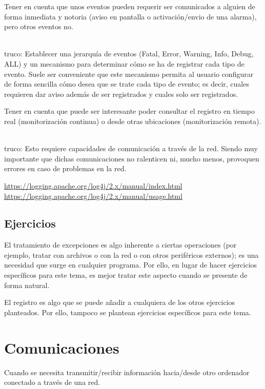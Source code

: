 \documentclass[spanish,12pt,a4paper,final,oneside]{book}
\begin{document}
Tener en cuenta que unos eventos pueden requerir ser comunicados a alguien de forma inmediata y notoria (aviso en pantalla o activación/envio de una alarma), pero otros eventos no. 
\begin{footnotesize}
\\truco: Establecer una jerarquía de eventos (Fatal, Error, Warning, Info, Debug, ALL) y un mecanismo para determinar cómo se ha de registrar cada tipo de evento. Suele ser conveniente que este mecanismo permita al usuario configurar de forma sencilla cómo desea que se trate cada tipo de evento; es decir, cuales requieren dar aviso además de ser registrados y cuales solo ser registrados.
\end{footnotesize}

Tener en cuenta que puede ser interesante poder consultar el registro en tiempo real (monitorización continua) o desde otras ubicaciones (monitorización remota).
\begin{footnotesize}
\\truco: Esto requiere capacidades de comunicación a través de la red. Siendo muy importante que dichas comunicaciones no ralenticen ni, mucho menos, provoquen errores en caso de problemas en la red.
\end{footnotesize}

\url{https://logging.apache.org/log4j/2.x/manual/index.html}
\\\url{https://logging.apache.org/log4j/2.x/manual/usage.html}

\section{Ejercicios}
El tratamiento de excepciones es algo inherente a ciertas operaciones (por ejemplo, tratar con archivos o con la red o con otros periféricos externos); es una necesidad que surge en cualquier programa. Por ello, en lugar de hacer ejercicios específicos para este tema, es mejor tratar este aspecto cuando se presente de forma natural.

El registro es algo que se puede añadir a cualquiera de los otros ejercicios planteados. Por ello, tampoco se plantean ejercicios específicos para este tema.


\chapter{Comunicaciones}
Cuando se necesita transmitir/recibir información hacia/desde otro ordenador conectado a través de una red.
\end{document}
